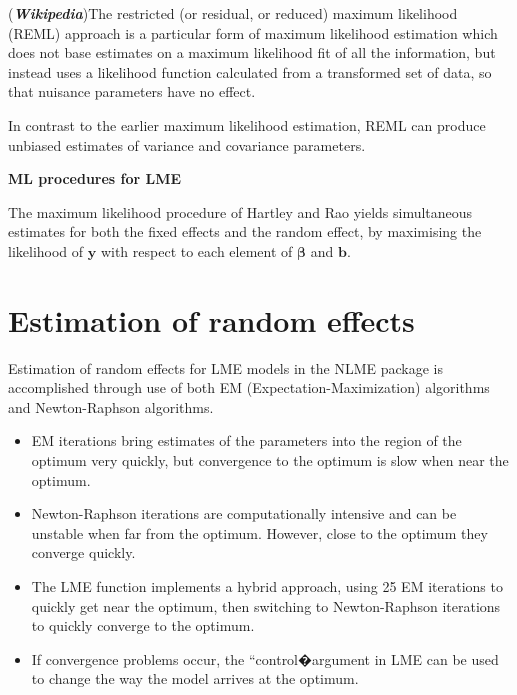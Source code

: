 \documentclass[12pt, a4paper]{report}
\theoremstyle{plain}
\theoremstyle{definition}
\theoremstyle{remark}
\begin{document}
	(\textbf{\emph{Wikipedia}})The restricted (or residual, or reduced) maximum likelihood (REML) approach is a particular form of maximum likelihood estimation which does not base estimates on a maximum likelihood fit of all the information, but instead uses a likelihood function calculated from a transformed set of data, so that nuisance parameters have no effect.
	
	In contrast to the earlier maximum likelihood estimation, REML can produce unbiased estimates of variance and covariance parameters.
	
	
	\noindent \textbf{ML procedures for LME}
	
	The maximum likelihood procedure of Hartley and Rao yields
	simultaneous estimates for both the fixed effects and the random
	effect, by maximising the likelihood of $\boldsymbol{y}$ with
	respect to each element of $\boldsymbol{\beta}$ and
	$\boldsymbol{b}$.
	
	
	\section{Estimation of random effects}
	
	Estimation of random effects for LME models in the NLME package is accomplished through use
	of both EM (Expectation-Maximization) algorithms and Newton-Raphson algorithms.
	\begin{itemize}
		\item EM iterations bring estimates of the parameters into the region of the optimum very quickly, but
		convergence to the optimum is slow when near the optimum.
		\item Newton-Raphson iterations are computationally intensive and can be unstable when far from the
		optimum. However, close to the optimum they converge quickly.
		\item The LME function implements a hybrid approach, using 25 EM iterations to quickly get near the
		optimum, then switching to Newton-Raphson iterations to quickly converge to the optimum. \item If
		convergence problems occur, the ``control�argument in LME can be used to change the way the
		model arrives at the optimum.
	\end{itemize}
	
\end{document}
